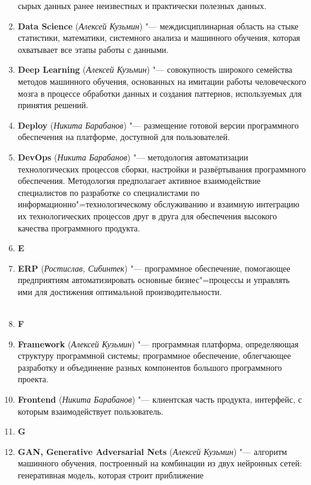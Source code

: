 \documentclass[a4paper, 14 pt]{extarticle}
\begin{document}
\begin{enumerate}
    сырых данных ранее неизвестных и практически полезных данных.
    \item \textbf{Data Science} (\textit{Алексей Кузьмин}) "--- 
    междисциплинарная область на стыке статистики, математики, системного 
    анализа и машинного обучения, которая охватывает все этапы работы с данными.
    \item \textbf{Deep Learning} (\textit{Алексей Кузьмин}) "--- совокупность 
    широкого семейства методов машинного обучения, основанных на имитации работы
    человеческого мозга в процессе обработки данных и создания паттернов, 
    используемых для принятия решений. 
    \item \textbf{Deploy} (\textit{Никита Барабанов}) "--- размещение 
    готовой версии программного обеспечения на платформе, доступной для 
    пользователей.
    \item \textbf{DevOps} (\textit{Никита Барабанов}) "---  методология 
    автоматизации технологических процессов сборки, настройки и развёртывания 
    программного обеспечения. Методология предполагает активное взаимодействие 
    специалистов по разработке со специалистами по 
    информационно"=технологическому обслуживанию и взаимную интеграцию их 
    технологических процессов друг в друга для обеспечения высокого качества
    программного продукта.
    \item[] \textbf{E}
    \item \textbf{ERP} (\textit{Ростислав, Сибинтек}) "--- программное 
    обеспечение, помогающее предприятиям автоматизировать основные 
    бизнес"=процессы и управлять ими для достижения оптимальной 
    производительности. \\
    \\
    \item[] \textbf{F}
    \item \textbf{Framework} (\textit{Алексей Кузьмин}) "--- программная 
    платформа, определяющая структуру программной системы; программное 
    обеспечение, облегчающее разработку и объединение разных компонентов 
    большого программного проекта.
    \item \textbf{Frontend} (\textit{Никита Барабанов}) "--- клиентская часть 
    продукта, интерфейс, с которым взаимодействует пользователь.
    \item[] \textbf{G}
    \item \textbf{GAN, Generative Adversarial Nets} (\textit{Алексей Кузьмин}) 
    "--- алгоритм машинного обучения, построенный на комбинации из двух 
    нейронных сетей: генеративная модель, которая строит приближение 

\end{enumerate}
\end{document}
